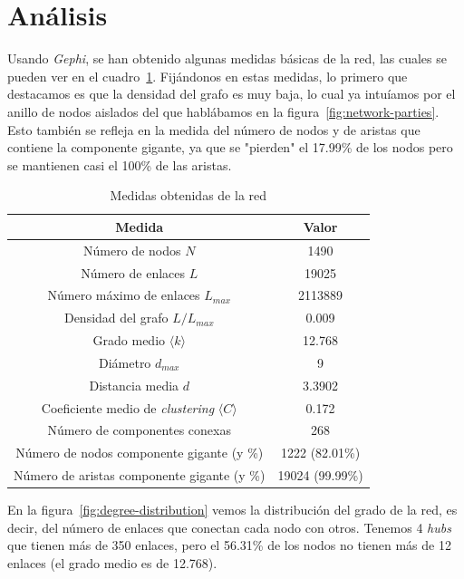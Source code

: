 \section{Análisis}

Usando \textit{Gephi}, se han obtenido algunas medidas básicas de la red, las
cuales se pueden ver en el cuadro~\ref{tab:measurements}. Fijándonos en estas
medidas, lo primero que destacamos es que la densidad del grafo es muy baja, lo
cual ya intuíamos por el anillo de nodos aislados del que hablábamos en la
figura~\ref{fig:network-parties}. Esto también se refleja en la medida del
número de nodos y de aristas que contiene la componente gigante, ya que se
"pierden" el 17.99\% de los nodos pero se mantienen casi el 100\% de las
aristas.

\begin{table}[h!]
    \caption{Medidas obtenidas de la red}
    \label{tab:measurements}
    \begin{center}
    \begin{tabular}{ |c|c| }
        \hline
        \textbf{Medida} & \textbf{Valor} \\
        \hline
        Número de nodos $N$ & 1490 \\
        \hline
        Número de enlaces $L$ & 19025 \\
        \hline
        Número máximo de enlaces $L_{max}$ & 2113889 \\
        \hline
        Densidad del grafo $L/L_{max}$ & 0.009 \\
        \hline
        Grado medio $\langle k \rangle$ & 12.768 \\
        \hline
        Diámetro $d_{max}$ & 9 \\
        \hline
        Distancia media $d$ & 3.3902 \\
        \hline
        Coeficiente medio de \textit{clustering} $\langle C \rangle$ & 0.172 \\
        \hline
        Número de componentes conexas & 268 \\
        \hline
        Número de nodos componente gigante (y \%) & 1222 (82.01\%) \\
        \hline
        Número de aristas componente gigante (y \%) & 19024 (99.99\%) \\
        \hline
    \end{tabular}
    \end{center}
\end{table}

En la figura~\ref{fig:degree-distribution} vemos la distribución del grado de la
red, es decir, del número de enlaces que conectan cada nodo con otros. Tenemos 4
\textit{hubs} que tienen más de 350 enlaces, pero el 56.31\% de los nodos no
tienen más de 12 enlaces (el grado medio es de 12.768).

